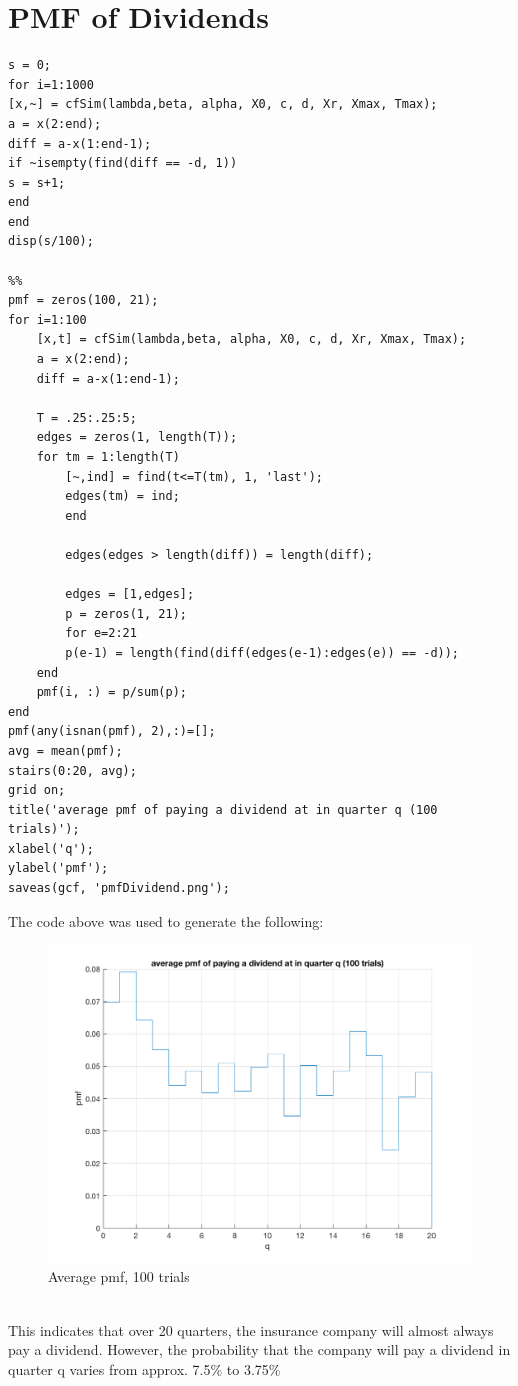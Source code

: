 \documentclass[]{article}
\begin{document}
\section{PMF of Dividends}
\begin{lstlisting}
s = 0;
for i=1:1000
[x,~] = cfSim(lambda,beta, alpha, X0, c, d, Xr, Xmax, Tmax);
a = x(2:end);
diff = a-x(1:end-1);
if ~isempty(find(diff == -d, 1))
s = s+1;
end
end
disp(s/100);

%%
pmf = zeros(100, 21);
for i=1:100
	[x,t] = cfSim(lambda,beta, alpha, X0, c, d, Xr, Xmax, Tmax);
	a = x(2:end);
	diff = a-x(1:end-1);
	
	T = .25:.25:5;
	edges = zeros(1, length(T));
	for tm = 1:length(T)
		[~,ind] = find(t<=T(tm), 1, 'last');
		edges(tm) = ind;
		end
		
		edges(edges > length(diff)) = length(diff);
		
		edges = [1,edges];
		p = zeros(1, 21);
		for e=2:21
		p(e-1) = length(find(diff(edges(e-1):edges(e)) == -d));
	end
	pmf(i, :) = p/sum(p);
end
pmf(any(isnan(pmf), 2),:)=[];
avg = mean(pmf);
stairs(0:20, avg);
grid on;
title('average pmf of paying a dividend at in quarter q (100 trials)');
xlabel('q');
ylabel('pmf');
saveas(gcf, 'pmfDividend.png');
\end{lstlisting}
The code above was used to generate the following: 
\begin{figure}[ht]
	\centering
	\includegraphics[width=0.7\linewidth]{figures/pmfDividend}
	\caption{Average pmf, 100 trials}
	\label{fig:pmfdividend}
\end{figure}
\pagebreak
\\
This indicates that over 20 quarters, the insurance company will almost always pay a dividend. However, the probability that the company will pay a dividend in quarter q varies from approx. 7.5\% to 3.75\% 
\end{document}
